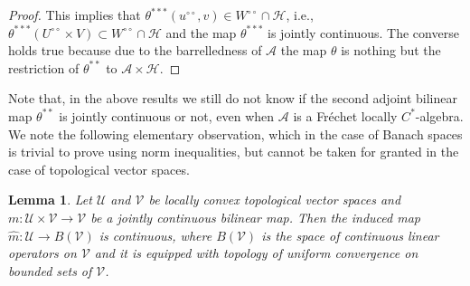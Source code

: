 \documentclass[10pt]{article}
\newtheorem{lemma}[theorem]{Lemma}
\theoremstyle{definition}
\begin{document}
\begin{proof}
		This implies that $\theta^{***}(u^{\circ\circ},v)\in W^{\circ\circ}\cap\mathcal H$, i.e., $\theta^{***}(U^{\circ\circ}\times V)\subset W^{\circ\circ}\cap\mathcal H$ and the map $\theta^{***}$ is jointly continuous. The converse holds true because due to the barrelledness of $\mathcal A$ the map $\theta$ is nothing but the restriction of $\theta^{**}$ to $\mathcal A\times \mathcal H$.
	\end{proof}
	Note that, in the above results we still do not know if the second adjoint bilinear map $\theta^{**}$ is jointly continuous or not, even when $\mathcal A$ is a Fr\'echet locally $C^*$-algebra.\\ 
	
	We note the following elementary observation, which in the case of Banach spaces is trivial to prove using norm inequalities, but cannot be taken for granted in the case of topological vector spaces.
	\begin{lemma}\label{biltolin}
		Let $\mathcal U$ and $\mathcal V$ be locally convex topological vector spaces and $m:\mathcal U\times \mathcal V\to \mathcal V$ be a jointly continuous bilinear map. Then the induced map $\hat m:\mathcal U\to B(\mathcal V)$ is continuous, where $B(\mathcal V)$ is the space of continuous linear operators on $\mathcal V$ and it is equipped with topology of uniform convergence on bounded sets of $\mathcal V$.
	\end{lemma}
	
\end{document}
